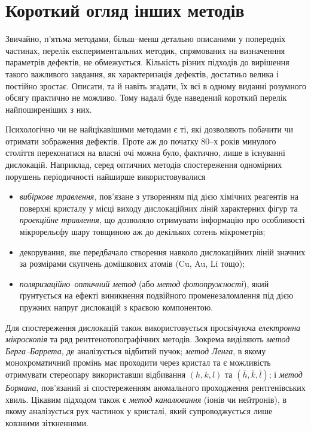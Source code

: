 \chapter{Короткий огляд інших методів}\label{chapOther}

Звичайно, п'ятьма методами, більш--менш детально описаними
у попередніх частинах, перелік експериментальних методик,
спрямованих на визначенння параметрів дефектів,
 не обмежується.
Кількість різних підходів до вирішення такого важливого завдання, як
характеризація дефектів, достатньо велика і постійно зростає.
Описати, та й навіть згадати, їх всі в одному
виданні розумного обсягу практично не можливо.
Тому надалі буде наведений короткий перелік найпоширеніших з них.

Психологічно чи не найцікавішими методами є ті, 
які дозволяють побачити чи отримати зображення
дефектів.
Проте аж до початку 80--х років минулого століття
переконатися на власні очі можна було, фактично, лише в існуванні
дислокацій.
Наприклад, серед оптичних методів спостереження одномірних порушень періодичності
найширше використовувалися 
\begin{itemize}
  \item \emph{вибіркове травлення}, пов'язане з утворенням під дією хімічних реагентів 
  на поверхні кристалу у місці виходу дислокаційних ліній
  характерних фігур 
  та \emph{проекційне травлення}, що дозволяло отримувати інформацію про особливості
  мікрорельєфу шару товщиною аж до декількох сотень мікрометрів;
  \item декорування, яке передбачало створення навколо дислокаційних ліній
   значних за розмірами скупчень домішкових атомів (Cu, Au, Li тощо);
  \item \emph{поляризаційно--оптичний метод} (або \emph{метод фотопружності}),
  який ґрунтується на ефекті виникнення подвійного променезаломлення
  під дією пружних напруг дислокацій з краєвою компонентою. 
\end{itemize}
Для спостереження дислокацій також використовується просвічуюча \emph{електронна
мікроскопія} та ряд рентгенотопографічних методів.
Зокрема виділяють 
\emph{метод Берга--Баррета}, де аналізується відбитий пучок;
\emph{метод Ленга}, в якому монохроматичний промінь має проходити через кристал
та є можливість отримувати стереопару використавши відбивання $(h,k,l)$ та $(\bar{h},\bar{k},\bar{l})$;
і \emph{метод Бормана}, пов'язаний зі спостереженням аномального проходження рентгенівських хвиль.
Цікавим підходом також є \emph{метод каналювання} (іонів чи нейтронів), в якому
аналізується рух частинок у кристалі, який супроводжується лише ковзними зіткненнями.

